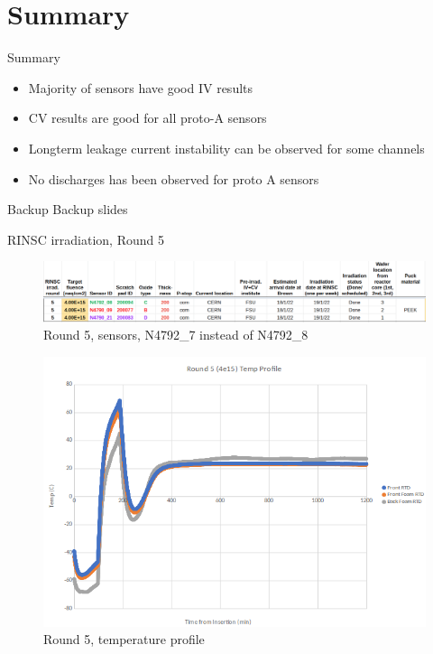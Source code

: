 \documentclass{beamer}
\begin{document}
\section{Summary}
\begin{frame}{Summary}
  \begin{itemize}
    \item Majority of sensors have good IV results
    \item CV results are good for all proto-A sensors
    \item Longterm leakage current instability can be observed  for some channels
    \item No discharges has been observed for proto A sensors
  \end{itemize}
\end{frame}

\appendix

\begin{frame}{Backup}
	\center
	\huge
	Backup slides
\end{frame}


\begin{frame}{RINSC irradiation, Round 5}

    \begin{figure}
        \includegraphics[width=.7\textwidth]{plots/Round_5_sensors.png}
        \caption{Round 5, sensors, N4792\_7 instead of N4792\_8}
    \end{figure}
    \begin{figure}
      \includegraphics[width=.5\textwidth]{plots/Round5_temp_profile.png}
      \caption{Round 5, temperature profile}
    \end{figure}
\end{frame}
\end{document}
